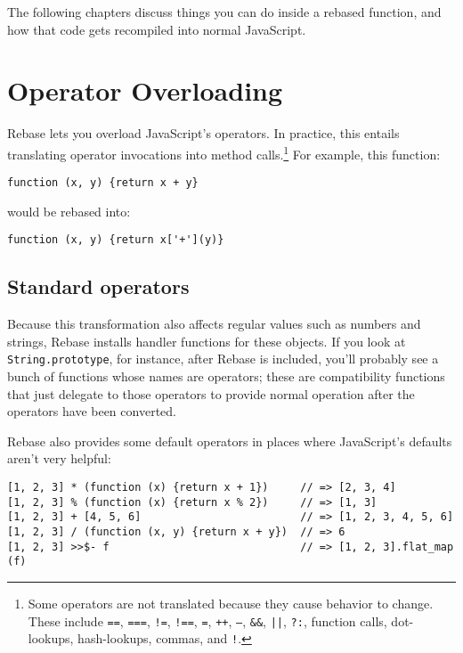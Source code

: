\documentclass{report}
\begin{document}
    The following chapters discuss things you can do inside a rebased function, and how that code gets recompiled into normal JavaScript.

\chapter {Operator Overloading}
    Rebase lets you overload JavaScript's operators. In practice, this entails translating operator invocations into method calls.\footnote{Some operators are not translated because they cause
    behavior to change. These include {\tt ==}, {\tt ===}, {\tt !=}, {\tt !==}, {\tt =}, {\tt ++}, {\tt --}, {\tt \&\&}, {\tt ||}, {\tt ?:}, function calls, dot-lookups, hash-lookups, commas,
    and {\tt !}.} For example, this function:

\begin{verbatim}
function (x, y) {return x + y}
\end{verbatim}

    \noindent would be rebased into:

\begin{verbatim}
function (x, y) {return x['+'](y)}
\end{verbatim}

\section {Standard operators}
      Because this transformation also affects regular values such as numbers and strings, Rebase installs handler functions for these objects. If you look at \verb|String.prototype|, for
      instance, after Rebase is included, you'll probably see a bunch of functions whose names are operators; these are compatibility functions that just delegate to those operators to provide
      normal operation after the operators have been converted.

      Rebase also provides some default operators in places where JavaScript's defaults aren't very helpful:

\begin{verbatim}
[1, 2, 3] * (function (x) {return x + 1})     // => [2, 3, 4]
[1, 2, 3] % (function (x) {return x % 2})     // => [1, 3]
[1, 2, 3] + [4, 5, 6]                         // => [1, 2, 3, 4, 5, 6]
[1, 2, 3] / (function (x, y) {return x + y})  // => 6
[1, 2, 3] >>$- f                              // => [1, 2, 3].flat_map (f)
\end{verbatim}
\end{document}
